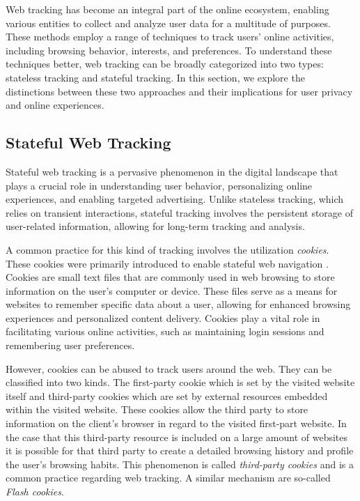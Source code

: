 Web tracking has become an integral part of the online ecosystem, enabling various 
entities to collect and analyze user data for a multitude of purposes. These methods
employ a range of techniques to track users' online activities, including browsing behavior,
interests, and preferences. To understand these techniques better, web tracking can be broadly
categorized into two types: stateless tracking and stateful tracking. In this section, we explore
the distinctions between these two approaches and their implications for user privacy and online experiences.

\subsection{Stateful Web Tracking}
Stateful web tracking is a pervasive phenomenon in the digital landscape that plays a crucial role in understanding user behavior,
personalizing online experiences, and enabling targeted advertising. Unlike stateless tracking, which relies on transient interactions,
stateful tracking involves the persistent storage of user-related information, allowing for long-term tracking and analysis. 

A common practice for this kind of tracking involves the utilization \emph{cookies}. These cookies were primarily introduced to enable 
stateful web navigation \cite{jschwartz}. Cookies are small text files that are commonly used in web browsing to store information
on the user's computer or device. These files serve as a means for websites to remember specific data about a user,
allowing for enhanced browsing experiences and personalized content delivery. Cookies play a vital role in facilitating
various online activities, such as maintaining login sessions and remembering user preferences.

However, cookies can be abused to track users around the web. They can be classified into two kinds.
The first-party cookie which is set by the visited website itself and third-party cookies which are set by external 
resources embedded within the visited website. These cookies allow the third party to store information on the client's browser in regard 
to the visited first-part website. In the case that this third-party resource is included on a large amount of websites it is possible 
for that third party to create a detailed browsing history and profile the user's browsing habits. This phenomenon is called \emph{third-party cookies}
and is a common practice regarding web tracking. A similar mechanism are so-called \emph{Flash cookies}. 

